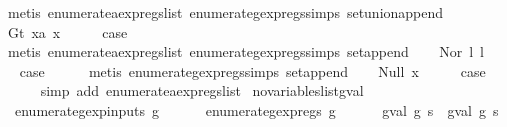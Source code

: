 \begin{isabellebody}
\ {\isacharparenleft}metis\ enumerate{\isacharunderscore}aexp{\isacharunderscore}regs{\isacharunderscore}list\ enumerate{\isacharunderscore}gexp{\isacharunderscore}regs{\isachardot}simps{\isacharparenleft}{}{\isacharparenright}\ set{\isacharunderscore}union{\isacharunderscore}append{\isacharparenright}\isanewline
{}\isamarkupfalse%
\isanewline
\ \ \isamarkupfalse%
\ {\isacharparenleft}Gt\ x{}a\ x{}{\isacharparenright}\isanewline
\ \ \isamarkupfalse%
\ \isamarkupfalse%
\ {\isacharquery}case\isanewline
\ \ \ \ \isamarkupfalse%
\ {\isacharparenleft}metis\ enumerate{\isacharunderscore}aexp{\isacharunderscore}regs{\isacharunderscore}list\ enumerate{\isacharunderscore}gexp{\isacharunderscore}regs{\isachardot}simps{\isacharparenleft}{}{\isacharparenright}\ set{\isacharunderscore}append{\isacharparenright}\isanewline
{}\isamarkupfalse%
\isanewline
\ \ \isamarkupfalse%
\ {\isacharparenleft}Nor\ l{}\ l{}{\isacharparenright}\isanewline
\ \ \isamarkupfalse%
\ \isamarkupfalse%
\ {\isacharquery}case\isanewline
\ \ \ \ \isamarkupfalse%
\ {\isacharparenleft}metis\ enumerate{\isacharunderscore}gexp{\isacharunderscore}regs{\isachardot}simps{\isacharparenleft}{}{\isacharparenright}\ set{\isacharunderscore}append{\isacharparenright}\isanewline
{}\isamarkupfalse%
\isanewline
\ \ \isamarkupfalse%
\ {\isacharparenleft}Null\ x{\isacharparenright}\isanewline
\ \ \isamarkupfalse%
\ \isamarkupfalse%
\ {\isacharquery}case\isanewline
\ \ \ \ \isamarkupfalse%
\ {\isacharparenleft}simp\ add{\isacharcolon}\ enumerate{\isacharunderscore}aexp{\isacharunderscore}regs{\isacharunderscore}list{\isacharparenright}\isanewline
{}\isamarkupfalse%
%
\endisatagproof
{\isafoldproof}%
%
\isadelimproof
\isanewline
%
\endisadelimproof
\isanewline
{}\isamarkupfalse%
\ no{\isacharunderscore}variables{\isacharunderscore}list{\isacharunderscore}gval{\isacharcolon}\isanewline
\ \ {\isachardoublequoteopen}enumerate{\isacharunderscore}gexp{\isacharunderscore}inputs\ g\ {\isacharequal}\ {\isacharbraceleft}{\isacharbraceright}\ {\isasymLongrightarrow}\isanewline
\ \ \ enumerate{\isacharunderscore}gexp{\isacharunderscore}regs\ g\ {\isacharequal}\ {\isacharbraceleft}{\isacharbraceright}\ {\isasymLongrightarrow}\isanewline
\ \ \ gval\ g\ s\ {\isacharequal}\ gval\ g\ s{\isacharprime}{\isachardoublequoteclose}\isanewline

\end{isabellebody}
